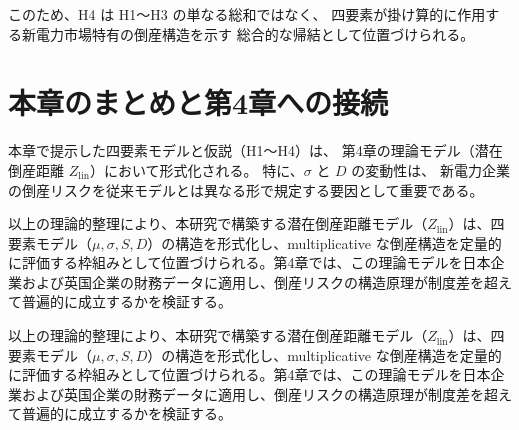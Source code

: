 このため、H4 は H1〜H3 の単なる総和ではなく、
四要素が掛け算的に作用する新電力市場特有の倒産構造を示す
総合的な帰結として位置づけられる。


\section{本章のまとめと第4章への接続}

本章で提示した四要素モデルと仮説（H1〜H4）は、
第4章の理論モデル（潜在倒産距離 $Z_{\text{lin}}$）において形式化される。
特に、$\sigma$ と $D$ の変動性は、
新電力企業の倒産リスクを従来モデルとは異なる形で規定する要因として重要である。

以上の理論的整理により、本研究で構築する潜在倒産距離モデル（$Z_{\text{lin}}$）は、四要素モデル（$\mu, \sigma, S, D$）の構造を形式化し、multiplicative な倒産構造を定量的に評価する枠組みとして位置づけられる。第4章では、この理論モデルを日本企業および英国企業の財務データに適用し、倒産リスクの構造原理が制度差を超えて普遍的に成立するかを検証する。

以上の理論的整理により、本研究で構築する潜在倒産距離モデル（$Z_{\text{lin}}$）は、四要素モデル（$\mu, \sigma, S, D$）の構造を形式化し、multiplicative な倒産構造を定量的に評価する枠組みとして位置づけられる。第4章では、この理論モデルを日本企業および英国企業の財務データに適用し、倒産リスクの構造原理が制度差を超えて普遍的に成立するかを検証する。
